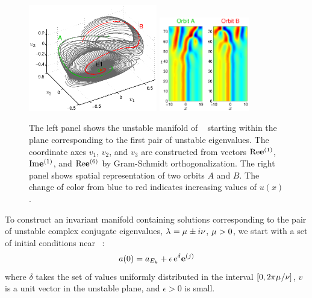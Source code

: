 \begin{figure}[t]
\begin{center}
\includegraphics[width=0.5\textwidth]{figs/ks22_E1_plane1_manifold.eps}
\includegraphics[width=0.35\textwidth]{figs/ks22_E1_plane1_orbits.eps}
\end{center}
\caption{
The left panel shows the unstable
manifold of \eqv\  starting within the plane
corresponding to the first pair of unstable eigenvalues. The
coordinate axes $v_1$, $v_2$, and $v_3$ are constructed from vectors
$\mathrm{Re} {\mathbf e}^{(1)}$, $\mathrm{Im} {\mathbf e}^{(1)}$, 
and $\mathrm{Re} {\mathbf e}^{(6)}$
by Gram-Schmidt orthogonalization.
The right panel shows spatial representation of two orbits $A$ and $B$.
The change of color from blue to red indicates increasing values of
$u(x)$.}
\label{f:KS22E1man1}
\end{figure}

To construct an invariant manifold containing solutions
corresponding to the pair of unstable complex conjugate eigenvalues,
$\lambda_{ }= \mu_{ } \pm i\nu_{ }$,
$\mu_{ } > 0$, we start with a set of
initial conditions near \eqv\ :
\[ a(0) = a_{{E_{k}}} + \epsilon\,\mathrm{e}^{\delta}{\mathbf e}^{(j)}
\]
where $\delta$ takes the set of values uniformly distributed in the
interval $[0,2\pi\mu_{ }/\nu_{ }]$, $v$ is a unit vector in the
unstable plane, and $\epsilon > 0$ is small.

